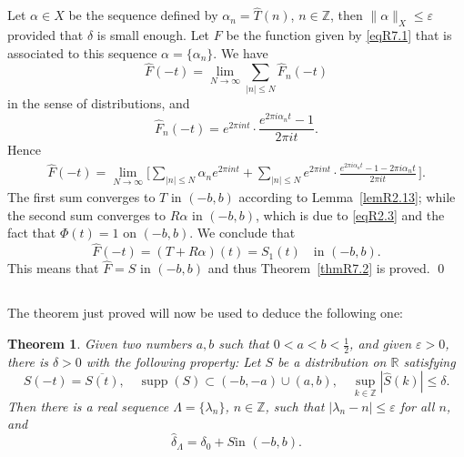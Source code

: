 \documentclass[reqno,a4paper,12pt]{amsart}
\numberwithin{equation}{section}
\numberwithin{figure}{section}
\newcommand\R{\mathbb{R}}
\newcommand\Z{\mathbb{Z}}
\newcommand\lam{\lambda}
\newcommand\Lam{\Lambda}
\newcommand\1{\mathds{1}}
\newcommand\eps{\varepsilon}
\renewcommand\le{\leqslant}
\renewcommand\leq{\leqslant}
\newcommand\sbt{\subset}
\renewcommand\hat{\widehat}
\newcommand{\ft}[1]{\widehat{#1}}
\newcommand{\supp}{\operatorname{supp}}
\newcommand{\half}{\tfrac{1}{2}}
\theoremstyle{plain}
\newtheorem{thm}{Theorem}[section]
\newcommand{\thmref}[1]{Theorem~\ref{#1}}
\newcommand{\lemref}[1]{Lemma~\ref{#1}}
\theoremstyle{definition}
\begin{document}
Let $\alpha \in X$ be the sequence defined by
 $\alpha_n=\ft{T}(n)$, $n\in\Z$, then
$\|\alpha\|_X \leq \eps$ provided that
 $\delta$ is small enough. Let
 $F$ be the function given by \eqref{eqR7.1} that is
associated to this sequence $\alpha=\{\alpha_n\}$. We have
\[
\hat F (-t) = \lim_{N\to\infty}\sum_{|n|\le N}\hat F_n(-t)
\]
 in the sense of distributions, and
\[
\hat F_n(-t) = e^{2\pi int} \cdot \frac{e^{2\pi i\alpha_n t}-1}{2\pi it}.
\]
Hence
\begin{align*}
\hat F(-t) =
\lim_{N\to\infty} \Big[ \sum_{|n|\le N} \alpha_n e^{2\pi int} 
 + \sum_{|n|\le N} e^{2\pi int}  \cdot
\frac{e^{2\pi i\alpha_n t}-1-2\pi i\alpha_n t}{2\pi it} \, \Big].
\end{align*}
The first sum converges to $T$ in $(-b,b)$ according to
  \lemref{lemR2.13}; while the second sum  converges 
to $R\alpha$ in $(-b,b)$, which is due to \eqref{eqR2.3} and
the fact that
$\Phi(t)=1$ on $(-b,b)$. We conclude that
\[
 \hat F(-t)= (T + R\alpha)(t) = S_1(t)
\quad \text{in $(-b,b)$.}
\]
This means that $\ft{F} = S$ in $(-b,b)$ and thus
\thmref{thmR7.2} is proved.
\qed



\subsection{}
The theorem just proved will now
be used to deduce the following one:


 \begin{thm}
\label{thmR7.5}
Given two numbers $a,b$ such that $0 <a<b < \half$,
and given $\eps>0$,  there is $\delta >0$ 
with the following property: 
Let $S$ be a distribution on $\R$ satisfying
 \begin{equation}
\label{eqR7.5.11}
S(-t) = \overline{S(t)}, \quad
\supp(S) \sbt  (-b,-a) \cup (a,b), \quad
\sup_{k \in \Z} |\ft{S}(k)| \leq \delta.
\end{equation}
Then there is a 
 real sequence $\Lam = \{\lam_n\}$, $n\in\Z$,
such that 
$|\lam_n - n | \leq \eps$ for all $n$, and
 \begin{equation}
\label{eqR7.5.12}
\text{$\ft{\delta}_\Lam =  \delta_0 + S$
 in $(-b,b)$.}
 \end{equation}
 \end{thm}
\end{document}
